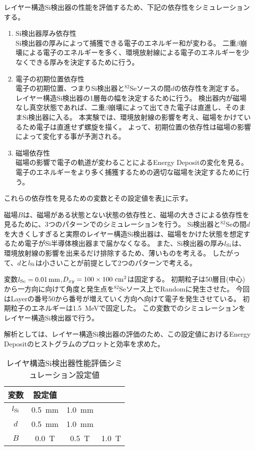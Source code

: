\documentclass[a4paper,10pt]{jreport}
\begin{document}
レイヤー構造Si検出器の性能を評価するため、下記の依存性をシミュレーションする。

\begin{enumerate}
	\item Si検出器厚み依存性 \\
	Si検出器の厚みによって捕獲できる電子のエネルギー和が変わる。
	二重$\beta$崩壊による電子のエネルギーを多く、環境放射線による電子のエネルギーを少なくできる厚みを決定するために行う。
	
	\item 電子の初期位置依存性 \\
	電子の初期位置、つまりSi検出器と$^{82}$Seソースの間$d$の依存性を測定する。
	レイヤー構造Si検出器の1層毎の幅を決定するために行う。
	検出器内が磁場なし真空状態であれば、二重$\beta$崩壊によって出てきた電子は直進し、そのままSi検出器に入る。
	本実験では、環境放射線の影響を考え、磁場をかけているため電子は直進せず螺旋を描く。
	よって、初期位置の依存性は磁場の影響によって変化する事が予測される。
	
	\item 磁場依存性 \\
	磁場の影響で電子の軌道が変わることによるEnergy Depositの変化を見る。
	電子のエネルギーをより多く捕獲するための適切な磁場を決定するために行う。
\end{enumerate}

これらの依存性を見るための変数とその設定値を表\ref{Tab-Dpendence}に示す。

磁場$B$は、磁場がある状態とない状態の依存性と、磁場の大きさによる依存性を見るために、3つのパターンでのシミュレーションを行う。
Si検出器と$^{82}$Seの間$d$を大きくしすぎると実際のレイヤー構造Si検出器は、磁場をかけた状態を想定するため電子がSi半導体検出器まで届かなくなる。
また、Si検出器の厚み$l_{\rm{Si}}$は、環境放射線の影響を出来るだけ排除するため、薄いものを考える。
したがって、$d$と$l_{\rm{Si}}$は小さいことが前提として2つのパターンで考える。

変数$l_{\rm{Se}} = \SI{0.01}{mm}$,$D_{xy} =100\times100\ \rm{cm}^2$は固定する。
初期粒子は50層目(中心)から一方向に向けて角度と発生点を$^{82}$Seソース上でRandomに発生させた。
今回はLayerの番号50から番号が増えていく方向へ向けて電子を発生させている。
初期粒子のエネルギーは\SI{1.5}{MeV}で固定した。
この変数でのシミュレーションをレイヤー構造Si検出器で行う。

解析としては、レイヤー構造Si検出器の評価のため、この設定値におけるEnergy Depositのヒストグラムのプロットと効率を求めた。

\begin{table}[H] 
	\center
	\caption{レイヤ構造Si検出器性能評価シミュレーション設定値} \label{Tab-Dpendence}
	\begin{tabular}{cccc}
		\hline
		変数 & 設定値  \\
		\hline
		$l_{\rm{Si}}$ &  \SI{0.5}{mm} & \SI{1.0}{mm} & \\
		$d$ & \SI{0.5}{mm} & \SI{1.0}{mm} & \\
		$B$ & \SI{0.0}{T} & \SI{0.5}{T} & \SI{1.0}{T} \\
		\hline
	\end{tabular}
\end{table}
\end{document}
